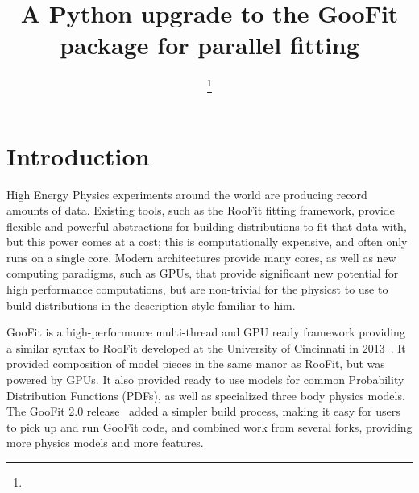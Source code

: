 \documentclass{webofc}
\begin{document}
%
\title{A Python upgrade to the GooFit package for parallel fitting}

\author{
        \fnsep\thanks{}
        \and
        \and 
        \and
        \and 
        \and 
}        %


%
\maketitle
%
\section{Introduction}
\label{intro}
High Energy Physics experiments around the world are producing record amounts of data. Existing tools, such as the RooFit fitting framework, provide flexible and powerful abstractions for building distributions to fit that data with, but this power comes at a cost; this is computationally expensive, and often only runs on a single core. Modern architectures provide many cores, as well as new computing paradigms, such as GPUs, that provide significant new potential for high performance computations, but are non-trivial for the physicst to use to build distributions in the description style familiar to him.

GooFit is a high-performance multi-thread and GPU ready framework providing a similar syntax to RooFit developed at the University of Cincinnati in 2013~\cite{lib:GooFit:main}. It provided composition of model pieces in the same manor as RooFit, but was powered by GPUs. It also provided ready to use models for common Probability Distribution Functions (PDFs), as well as specialized three body physics models. The GooFit 2.0 release~\cite{lib:GooFit} added a simpler build process, making it easy for users to pick up and run GooFit code, and combined work from several forks, providing more physics models and more features.
\end{document}

